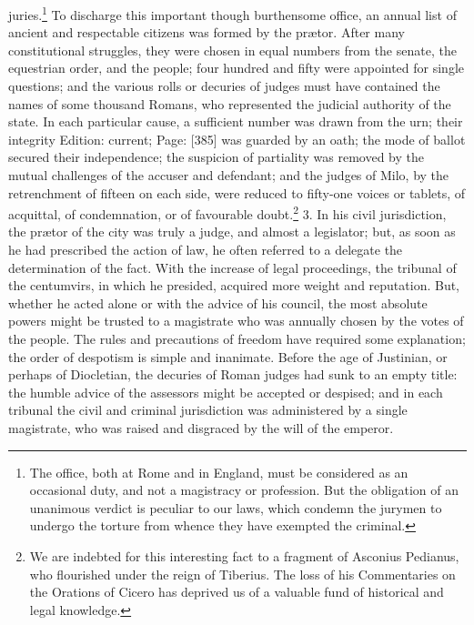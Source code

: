 juries.\footnote{The office, both at Rome and in England, must be considered as an occasional duty, and not a magistracy or profession. But the obligation of an unanimous verdict is peculiar to our laws, which condemn the jurymen to undergo the torture from whence they have exempted the criminal.} To discharge this important though burthensome office, an annual list of ancient and respectable citizens was formed by the prætor. After many constitutional struggles, they were chosen in equal numbers from the senate, the equestrian order, and the people; four hundred and fifty were appointed for single questions; and the various rolls or decuries of judges must have contained the names of some thousand Romans, who represented the judicial authority of the state. In each particular cause, a sufficient number was drawn from the urn; their integrity Edition: current; Page: [385] was guarded by an oath; the mode of ballot secured their independence; the suspicion of partiality was removed by the mutual challenges of the accuser and defendant; and the judges of Milo, by the retrenchment of fifteen on each side, were reduced to fifty-one voices or tablets, of acquittal, of condemnation, or of favourable doubt.\footnote{We are indebted for this interesting fact to a fragment of Asconius Pedianus, who flourished under the reign of Tiberius. The loss of his Commentaries on the Orations of Cicero has deprived us of a valuable fund of historical and legal knowledge.} 3. In his civil jurisdiction, the prætor of the city was truly a judge, and almost a legislator; but, as soon as he had prescribed the action of law, he often referred to a delegate the determination of the fact. With the increase of legal proceedings, the tribunal of the centumvirs, in which he presided, acquired more weight and reputation. But, whether he acted alone or with the advice of his council, the most absolute powers might be trusted to a magistrate who was annually chosen by the votes of the people. The rules and precautions of freedom have required some explanation; the order of despotism is simple and inanimate. Before the age of Justinian, or perhaps of Diocletian, the decuries of Roman judges had sunk to an empty title: the humble advice of the assessors might be accepted or despised; and in each tribunal the civil and criminal jurisdiction was administered by a single magistrate, who was raised and disgraced by the will of the emperor.

